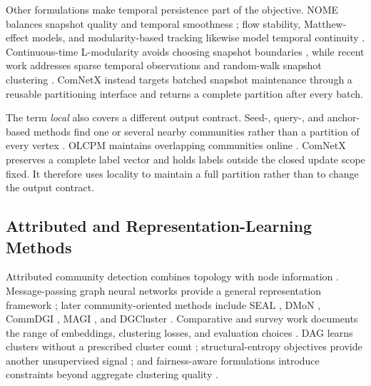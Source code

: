 \documentclass{ieeeaccess}
\begin{document}
Other formulations make temporal persistence part of the objective. NOME
balances snapshot quality and temporal smoothness \cite{Cai2023NOME}; flow
stability, Matthew-effect models, and modularity-based tracking likewise model
temporal continuity \cite{Bovet2022FlowStability,Sun2022Matthew,Mazza2023}.
Continuous-time L-modularity avoids choosing snapshot boundaries
\cite{Brabant2025LModularity}, while recent work addresses sparse temporal
observations and random-walk snapshot clustering
\cite{Conrad2025Sparse,Blaskovic2025}. ComNetX instead targets batched snapshot
maintenance through a reusable partitioning interface and returns a complete
partition after every batch.

The term \emph{local} also covers a different output contract. Seed-, query-,
and anchor-based methods find one or several nearby communities rather than a
partition of every vertex \cite{DiTursi2017,Christopoulos2023,
Liu2021MultiLocal}. OLCPM maintains overlapping communities online
\cite{Boudebza2018OLCPM}. ComNetX preserves a complete label vector and holds
labels outside the closed update scope fixed. It therefore uses locality to
maintain a full partition rather than to change the output contract.

\subsection{Attributed and Representation-Learning Methods}

Attributed community detection combines topology with node information
\cite{Chunaev2020}. Message-passing graph neural networks provide a general
representation framework \cite{Scarselli2009}; later community-oriented
methods include SEAL \cite{Zhang2020SEAL}, DMoN
\cite{Tsitsulin2023DMoN}, CommDGI \cite{Zhang2020CommDGI}, MAGI
\cite{Liu2024MAGI}, and DGCluster \cite{Bhowmick2024DGCluster}. Comparative
and survey work documents the range of embeddings, clustering losses, and
evaluation choices \cite{Kumar2024GNNStudy,Liu2026DeepGraphSurvey}. DAG learns
clusters without a prescribed cluster count \cite{Liu2024DAG};
structural-entropy objectives provide another unsupervised signal
\cite{Zhang2025StructuralEntropy}; and fairness-aware formulations introduce
constraints beyond aggregate clustering quality \cite{Gkartzios2025Fair}.
\end{document}

